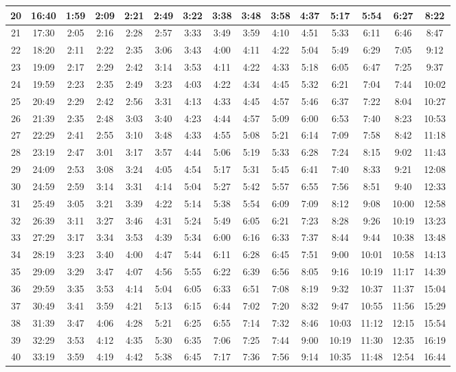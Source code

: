 \begin{scriptsize}
\begin{tabular}{c | c | c | c | c | c | c | c | c | c | c | c | c | c | c}
		20&16:40&1:59&2:09&2:21&2:49&3:22&3:38&3:48&3:58&4:37&5:17&5:54&6:27&8:22\\\hline
		21&17:30&2:05&2:16&2:28&2:57&3:33&3:49&3:59&4:10&4:51&5:33&6:11&6:46&8:47\\\hline
		22&18:20&2:11&2:22&2:35&3:06&3:43&4:00&4:11&4:22&5:04&5:49&6:29&7:05&9:12\\\hline
		23&19:09&2:17&2:29&2:42&3:14&3:53&4:11&4:22&4:33&5:18&6:05&6:47&7:25&9:37\\\hline
		24&19:59&2:23&2:35&2:49&3:23&4:03&4:22&4:34&4:45&5:32&6:21&7:04&7:44&10:02\\\hline
		25&20:49&2:29&2:42&2:56&3:31&4:13&4:33&4:45&4:57&5:46&6:37&7:22&8:04&10:27\\\hline
		26&21:39&2:35&2:48&3:03&3:40&4:23&4:44&4:57&5:09&6:00&6:53&7:40&8:23&10:53\\\hline
		27&22:29&2:41&2:55&3:10&3:48&4:33&4:55&5:08&5:21&6:14&7:09&7:58&8:42&11:18\\\hline
		28&23:19&2:47&3:01&3:17&3:57&4:44&5:06&5:19&5:33&6:28&7:24&8:15&9:02&11:43\\\hline
		29&24:09&2:53&3:08&3:24&4:05&4:54&5:17&5:31&5:45&6:41&7:40&8:33&9:21&12:08\\\hline
		30&24:59&2:59&3:14&3:31&4:14&5:04&5:27&5:42&5:57&6:55&7:56&8:51&9:40&12:33\\\hline
		31&25:49&3:05&3:21&3:39&4:22&5:14&5:38&5:54&6:09&7:09&8:12&9:08&10:00&12:58\\\hline
		32&26:39&3:11&3:27&3:46&4:31&5:24&5:49&6:05&6:21&7:23&8:28&9:26&10:19&13:23\\\hline
		33&27:29&3:17&3:34&3:53&4:39&5:34&6:00&6:16&6:33&7:37&8:44&9:44&10:38&13:48\\\hline
		34&28:19&3:23&3:40&4:00&4:47&5:44&6:11&6:28&6:45&7:51&9:00&10:01&10:58&14:13\\\hline
		35&29:09&3:29&3:47&4:07&4:56&5:55&6:22&6:39&6:56&8:05&9:16&10:19&11:17&14:39\\\hline
		36&29:59&3:35&3:53&4:14&5:04&6:05&6:33&6:51&7:08&8:19&9:32&10:37&11:37&15:04\\\hline
		37&30:49&3:41&3:59&4:21&5:13&6:15&6:44&7:02&7:20&8:32&9:47&10:55&11:56&15:29\\\hline
		38&31:39&3:47&4:06&4:28&5:21&6:25&6:55&7:14&7:32&8:46&10:03&11:12&12:15&15:54\\\hline
		39&32:29&3:53&4:12&4:35&5:30&6:35&7:06&7:25&7:44&9:00&10:19&11:30&12:35&16:19\\\hline
		40&33:19&3:59&4:19&4:42&5:38&6:45&7:17&7:36&7:56&9:14&10:35&11:48&12:54&16:44\\\hline

\end{tabular}
\end{scriptsize}
